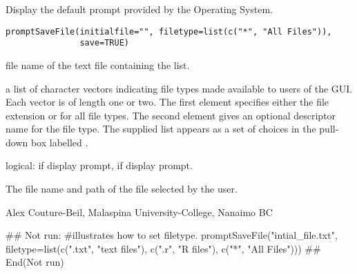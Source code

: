 \documentclass[letterpaper]{book}
\begin{document}
\begin{Description}\relax
Display the default  prompt provided by the Operating System.
\end{Description}
\begin{Usage}
\begin{verbatim}
promptSaveFile(initialfile="", filetype=list(c("*", "All Files")), 
               save=TRUE)
\end{verbatim}
\end{Usage}
\begin{Arguments}
\begin{ldescription}
\item[\code{initialfile}] file name of the text file containing the list.
\item[\code{filetype}] a list of character vectors indicating file types made available 
to users of the GUI. Each vector is of length one or two. The first element 
specifies either the file extension or  for all file types. The second 
element gives an optional descriptor name for the file type. The supplied 
 list appears as a set of choices in the pull-down box labelled 
.
\item[\code{save}] logical: if  display  prompt, 
if  display  prompt.
\end{ldescription}
\end{Arguments}
\begin{Value}
The file name and path of the file selected by the user.
\end{Value}
\begin{Author}\relax
Alex Couture-Beil, Malaspina University-College, Nanaimo BC
\end{Author}
\begin{SeeAlso}\relax
{}
\end{SeeAlso}
\begin{Examples}
\begin{ExampleCode}
## Not run: 
#illustrates how to set filetype.
promptSaveFile("intial_file.txt", filetype=list(c(".txt", "text files"), 
               c(".r", "R files"), c("*", "All Files")))
## End(Not run)
\end{ExampleCode}
\end{Examples}
\end{document}
